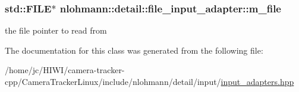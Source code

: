 \subsubsection[{\texorpdfstring{m\+\_\+file}{m_file}}]{\setlength{\rightskip}{0pt plus 5cm}std\+::\+F\+I\+LE$\ast$ nlohmann\+::detail\+::file\+\_\+input\+\_\+adapter\+::m\+\_\+file\hspace{0.3cm}{\ttfamily [private]}}\hypertarget{classnlohmann_1_1detail_1_1file__input__adapter_a164fbe2739ac97e517e22bc1fff1c174}{}\label{classnlohmann_1_1detail_1_1file__input__adapter_a164fbe2739ac97e517e22bc1fff1c174}


the file pointer to read from 



The documentation for this class was generated from the following file\+:\begin{DoxyCompactItemize}
\item 
/home/jc/\+H\+I\+W\+I/camera-\/tracker-\/cpp/\+Camera\+Tracker\+Linux/include/nlohmann/detail/input/\hyperlink{input__adapters_8hpp}{input\+\_\+adapters.\+hpp}\end{DoxyCompactItemize}
